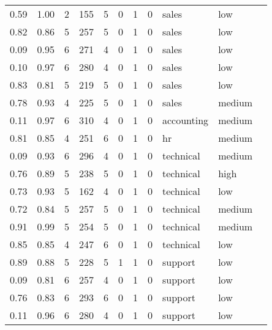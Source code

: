 \documentclass[11pt]{article}
\begin{document}
\begin{tabular}{r|llllllllll}
	 0.59        & 1.00        & 2           & 155         & 5           & 0           & 1           & 0           & sales       & low        \\
	 0.82        & 0.86        & 5           & 257         & 5           & 0           & 1           & 0           & sales       & low        \\
	 0.09        & 0.95        & 6           & 271         & 4           & 0           & 1           & 0           & sales       & low        \\
	 0.10        & 0.97        & 6           & 280         & 4           & 0           & 1           & 0           & sales       & low        \\
	 0.83        & 0.81        & 5           & 219         & 5           & 0           & 1           & 0           & sales       & low        \\
	 0.78        & 0.93        & 4           & 225         & 5           & 0           & 1           & 0           & sales       & medium     \\
	 0.11        & 0.97        & 6           & 310         & 4           & 0           & 1           & 0           & accounting  & medium     \\
	 0.81        & 0.85        & 4           & 251         & 6           & 0           & 1           & 0           & hr          & medium     \\
	 0.09        & 0.93        & 6           & 296         & 4           & 0           & 1           & 0           & technical   & medium     \\
	 0.76        & 0.89        & 5           & 238         & 5           & 0           & 1           & 0           & technical   & high       \\
	 0.73        & 0.93        & 5           & 162         & 4           & 0           & 1           & 0           & technical   & low        \\
	 0.72        & 0.84        & 5           & 257         & 5           & 0           & 1           & 0           & technical   & medium     \\
	 0.91        & 0.99        & 5           & 254         & 5           & 0           & 1           & 0           & technical   & medium     \\
	 0.85        & 0.85        & 4           & 247         & 6           & 0           & 1           & 0           & technical   & low        \\
	 0.89        & 0.88        & 5           & 228         & 5           & 1           & 1           & 0           & support     & low        \\
	 0.09        & 0.81        & 6           & 257         & 4           & 0           & 1           & 0           & support     & low        \\
	 0.76        & 0.83        & 6           & 293         & 6           & 0           & 1           & 0           & support     & low        \\
	 0.11        & 0.96        & 6           & 280         & 4           & 0           & 1           & 0           & support     & low        \\
\end{tabular}
\end{document}
